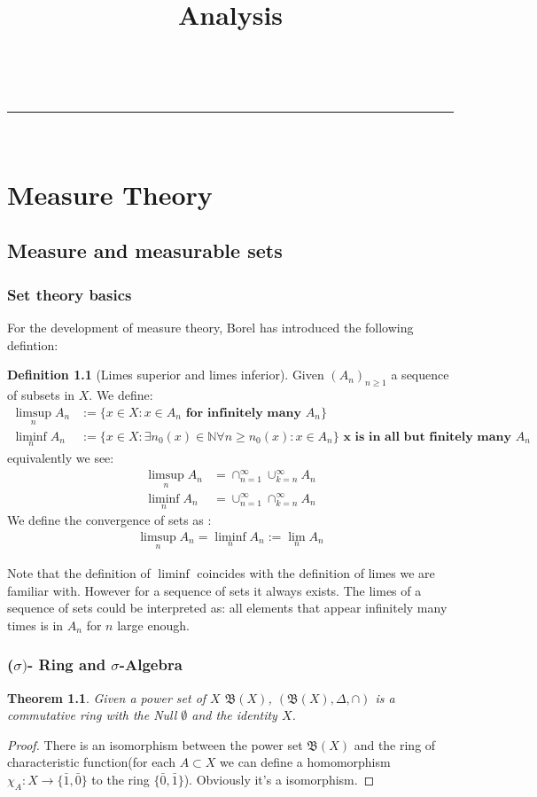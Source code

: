 \documentclass[a4paper,11pt,oneside,fleqn]{book}
\makeatletter
\newtheorem{theorem}{Theorem}[section]
\theoremstyle{definition}
\newtheorem{definition}{Definition}[section]
\theoremstyle{remark}
\newcommand{\linia}{\rule{\linewidth}{0.5pt}}
\renewcommand{\maketitle}{
\begin{center}
\vspace{2ex}
{\huge \textsc{\@title}}
\vspace{1ex}
\\
\linia\\
\@author \hfill \@date
\vspace{4ex}
\end{center}
}
\makeatother
\begin{document}
\title{Analysis}
\maketitle
\tableofcontents



\chapter{Measure Theory}
\section{Measure and measurable sets}

\subsection{Set theory basics}
For the development of measure theory, Borel has introduced the following defintion:
\begin{definition}[Limes superior and limes inferior]
	Given $(A_n)_{n \geq 1}$ a sequence of subsets in $X$. We define:
	\begin{align*}
		\limsup_n A_n &:= \{ x \in X: x \in A_n \textbf{ for infinitely many } A_n \}\\
		\liminf_n A_n &:= \{ x \in X: \exists n_0(x) \in \mathbb{N}\forall n \geq n_0(x): x \in A_n \} \textbf{ x is in all but finitely many $A_n$}
	\end{align*}
	equivalently we see:
	\begin{align*}
		\limsup_n A_n &= \cap_{n = 1}^\infty \cup_{k = n}^\infty A_n\\ 
		\liminf_n A_n &= \cup_{n = 1}^\infty \cap_{k = n}^\infty A_n
	\end{align*}
	We define the convergence of sets as :
	\begin{align*}
		\limsup_n A_n = \liminf_n A_n := \lim_n A_n
	\end{align*}
\end{definition}
Note that the definition of $\liminf$ coincides with the definition of limes we are familiar with. However for a sequence of sets it always exists. The limes of a sequence of sets could be interpreted as: all elements that appear infinitely many times is in $A_n$ for $n$ large enough.


\subsection{($\sigma)$- Ring and $\sigma$-Algebra}
\begin{theorem}
	Given a power set of $X$ $\mathfrak{B}(X)$, $(\mathfrak{B}(X), \Delta, \cap)$ is a commutative ring with the Null $\emptyset$ and the identity $X$.
\end{theorem}
\begin{proof}
	There is an isomorphism between the power set $\mathfrak{B}(X)$ and the ring of characteristic function(for each $A \subset X$ we can define a homomorphism $\chi_A: X \rightarrow \{\bar{1}, \bar{0} \}$ to the ring $\{\bar{0}, \bar{1}\}$). Obviously it's a isomorphism.
\end{proof}
\end{document}
